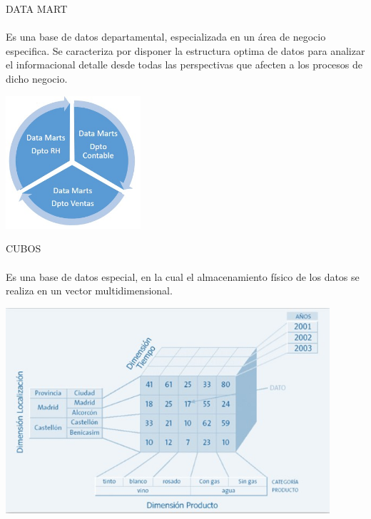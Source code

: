 \documentclass[preprint,12pt]{elsarticle}
\begin{document}
DATA MART\\
\\Es una base de datos departamental, especializada en un área de negocio especifica. Se caracteriza por disponer la estructura optima de datos para analizar el informacional detalle desde todas las perspectivas que afecten a los procesos de dicho negocio.

\begin{center}
	\includegraphics[width=5cm]{./Imagenes/imagen3} 
\end{center}

CUBOS\\
\\Es una base de datos especial, en la cual el almacenamiento físico de los datos se realiza en un vector multidimensional.
\begin{center}
	\includegraphics[width=12cm]{./Imagenes/imagen4} 
\end{center}
\end{document}
